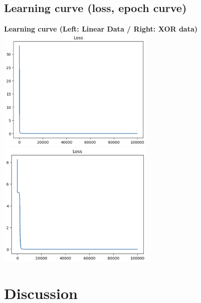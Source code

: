 \documentclass{article} %
\begin{document}
    \subsection{Learning curve (loss, epoch curve)}
    \textbf{Learning curve (Left: Linear Data / Right: XOR data)} \\
    \includegraphics[width=7.5cm]{./imgs/linear_loss.png} 
    \includegraphics[width=7.5cm]{./imgs/xor_loss.png} \\
    
    \section{Discussion}
    
\end{document}

